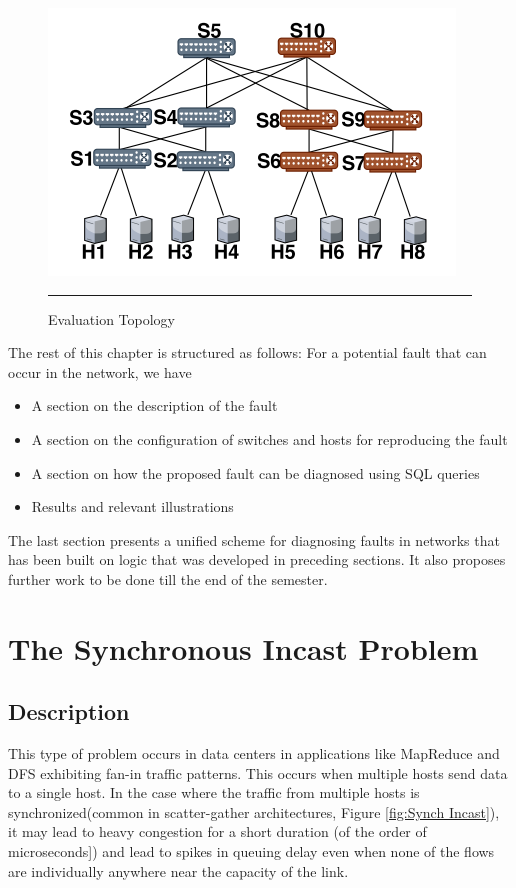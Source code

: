 \begin{figure}[htbp]
	\centering
		\includegraphics{Figures/Topology.png}
		\rule{35em}{0.5pt}
	\caption[Evaluation Topology]{Evaluation Topology}
	\label{fig:Topology}
\end{figure}
The rest of this chapter is structured as follows: For a potential fault that can occur in the network, we have
\begin{itemize}
    \item A section on the description of the fault
    \item A section on the configuration of switches and hosts for reproducing the fault
    \item A section on how the proposed fault can be diagnosed using SQL queries
    \item Results and relevant illustrations
\end{itemize}

The last section presents a unified scheme for diagnosing faults in networks that has been built on logic that was developed
in preceding sections. It also proposes further work to be done till the end of the semester.
\section{The Synchronous Incast Problem}

\subsection{Description}

This type of problem occurs in data centers in applications like MapReduce and DFS exhibiting fan-in traffic patterns.
This occurs when multiple hosts send data to a single host. In the case where the traffic from multiple hosts is
synchronized(common in scatter-gather architectures, Figure \ref{fig:Synch Incast}), it may lead to heavy congestion for a short duration (of the
order of microseconds]\cite{microburst}) and lead to spikes in queuing delay even when none of the flows are individually anywhere near
the capacity of the link.

